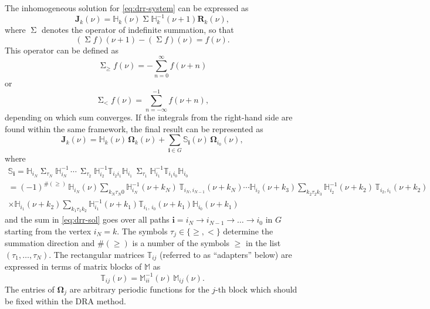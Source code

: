 \documentclass[sort&compress]{elsarticle}
\newcommand{\Sum}{\mathop{\Sigma}\nolimits}
\newcommand{\SumDown}{\Sum_{<} }
\newcommand{\SumUp}{\Sum_{\ge} }
\begin{document}
The inhomogeneous solution for \cref{eq:drr-system} can be expressed as
\begin{equation}
	\mathbf{J}_k(\nu) = \mathbb{H}_{k}(\nu) \Sum \mathbb{H}_k^{-1}(\nu+1) \mathbf{R}_k(\nu),
\end{equation}
where $\Sum$ denotes the operator of indefinite summation, so that
\begin{equation}
	(\Sum f)(\nu+1) - (\Sum f)(\nu) = f(\nu).
\end{equation}
This operator can be defined as
\begin{equation}
\label{eq:sum-up}
\SumUp f(\nu) = -\sum_{n=0}^\infty f(\nu+n)
\end{equation}
or
\begin{equation}
\label{eq:sum-down}
\SumDown f(\nu) = \sum_{n=-\infty}^{-1} f(\nu+n),
\end{equation}
depending on which sum converges.
If the integrals from the right-hand side are found within the same framework,
the final result can be represented as
\begin{equation}
	\label{eq:drr-sol}
	\mathbf{J}_k(\nu) = \mathbb{H}_k(\nu) \, \bm{\Omega}_k(\nu) + \sum_{\bm{i} \in G} \mathbb{S}_{\bm{i}}(\nu) \, \bm{\Omega}_{i_0}(\nu),
\end{equation}
where
\begin{multline}
\label{eq:fold-sum}
\mathbb{S}_{\bm{i}} = \mathbb{H}_{i_{N}} \Sum_{\tau_{N}} \mathbb{H}_{i_{N}}^{-1} \,
\cdots \,
\Sum_{\tau_{2}} \mathbb{H}_{i_2}^{-1} \mathbb{T}_{i_2 i_1} \mathbb{H}_{i_1} \,
\Sum_{\tau_{1}} \mathbb{H}_{i_1}^{-1} \mathbb{T}_{i_1 i_0} \mathbb{H}_{i_0} \\
= (-1)^{\#(\geq)} \, \mathbb{H}_{i_{N}}(\nu) \sum_{k_{N} \tau_{N} 0} 
\mathbb{H}_{i_{N}}^{-1}(\nu+k_{N}) \, \mathbb{T}_{i_{N}, i_{N-1}}(\nu+k_{N}) \cdots
\mathbb{H}_{i_2}(\nu+k_{3}) \sum_{k_{2} \tau_{2} k_{3}}
\mathbb{H}_{i_2}^{-1}(\nu+k_{2}) \, \mathbb{T}_{i_2, i_1}(\nu+k_2) \\
\times \mathbb{H}_{i_1}(\nu+k_{2}) \sum_{k_{1} \tau_{1} k_{2}}
\mathbb{H}_{i_1}^{-1}(\nu+k_{1}) \mathbb{T}_{i_1, \, i_0}(\nu+k_{1})
\mathbb{H}_{i_0}(\nu+k_{1})
\end{multline}
and the sum in \cref{eq:drr-sol} goes over all paths $\bm{i}=i_N \to i_{N-1} \to \ldots \to i_0$ in $G$ starting from the vertex $i_N=k$.
The symbols $\tau_j \in \{ \geq, < \}$ determine the summation direction and $\#(\geq)$ is a number of the symbols $\geq$ in the list $(\tau_1, \ldots, \tau_N)$.
The rectangular matrices $\mathbb{T}_{ij}$ (referred to as ``adapters'' below) are expressed in terms of matrix blocks of $\mathbb{M}$ as
\begin{equation}
	\label{eq:adapter}
	\mathbb{T}_{ij}(\nu) = \mathbb{M}^{-1}_{ii}(\nu) \, \mathbb{M}_{ij}(\nu).
\end{equation}
The entries of $\bm{\Omega}_j$ are arbitrary periodic functions for the $j$-th block which should be fixed within the DRA method.
\end{document}
